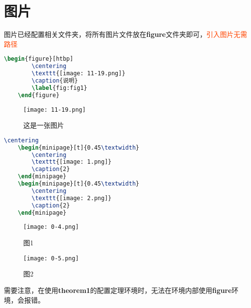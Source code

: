 \documentclass[12pt, a4paper, oneside, UTF8]{ctexbook}
\begin{document}
% 
\else
\fi


\chapter{图片}

图片已经配置相关文件夹，将所有图片文件放在\textbf{figure}文件夹即可，\textcolor{OrangeRed}{引入图片无需路径}

\begin{lstlisting}[language=TeX]
    \begin{figure}[htbp]
        \centering
        \texttt{[image: 11-19.png]}
        \caption{说明}
        \label{fig:fig1} 
    \end{figure}
\end{lstlisting}

\begin{figure}[htbp]
    \centering
    \texttt{[image: 11-19.png]}
    \caption{这是一张图片}
    \label{fig:fig1}
\end{figure}


\begin{lstlisting}[language=TeX]
    \centering
    \begin{minipage}[t]{0.45\textwidth}
        \centering
        \texttt{[image: 1.png]}
        \caption{2}
    \end{minipage}
    \begin{minipage}[t]{0.45\textwidth}
        \centering
        \texttt{[image: 2.png]}
        \caption{2}
    \end{minipage}
\end{lstlisting}

\begin{figure}[htbp]
    \centering
    \begin{minipage}[t]{0.48\textwidth}
        \centering
        \texttt{[image: 0-4.png]}
        \caption{图1}
    \end{minipage}
    \begin{minipage}[t]{0.48\textwidth}
        \centering
        \texttt{[image: 0-5.png]}
        \caption{图2}
    \end{minipage}
\end{figure}

\begin{remark}
    需要注意，在使用\textbf{theorem1}的配置定理环境时，无法在环境内部使用\textbf{figure}环境，会报错。
\end{remark}


\ifx\allfiles\undefined
\end{document}
